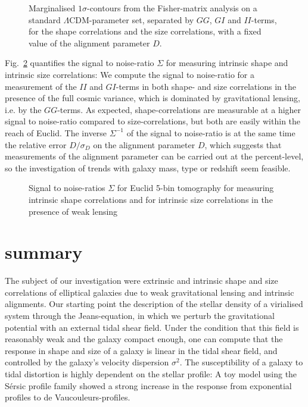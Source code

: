 \documentclass[a4paper,fleqn,usenatbib]{mnras}
\begin{document}
\begin{figure}
\centering
\caption{Marginalised $1\sigma$-contours from the Fisher-matrix analysis on a standard $\Lambda$CDM-parameter set, separated by $GG$, $GI$ and $II$-terms, for the shape correlations and the size correlations, with a fixed value of the alignment parameter $D$.}
\label{fig:fisher}
\end{figure}

Fig.~\ref{fig:s2n} quantifies the signal to noise-ratio $\Sigma$ for measuring intrinsic shape and intrinsic size correlations: We compute the signal to noise-ratio for a measurement of the $II$ and $GI$-terms in both shape- and size correlations in the presence of the full cosmic variance, which is dominated by gravitational lensing, i.e. by the $GG$-terms. As expected, shape-correlations are measurable at a higher signal to noise-ratio compared to size-correlations, but both are easily within the reach of Euclid. The inverse $\Sigma^{-1}$ of the signal to noise-ratio is at the same time the relative error $D/\sigma_D$ on the alignment parameter $D$, which suggests that measurements of the alignment parameter can be carried out at the percent-level, so the investigation of trends with galaxy mass, type or redshift seem feasible.

\begin{figure}
\centering
\caption{Signal to noise-ratios $\Sigma$ for Euclid 5-bin tomography for measuring intrinsic shape correlations and for intrinsic size correlations in the presence of weak lensing}
\label{fig:s2n}
\end{figure}


\section{summary}\label{sect_summary}
The subject of our investigation were extrinsic and intrinsic shape and size correlations of elliptical galaxies due to weak gravitational lensing and intrinsic alignments. Our starting point the description of the stellar density of a virialised system through the Jeans-equation, in which we perturb the gravitational potential with an external tidal shear field. Under the condition that this field is reasonably weak and the galaxy compact enough, one can compute that the response in shape and size of a galaxy is linear in the tidal shear field, and controlled by the galaxy's velocity dispersion $\sigma^2$. The susceptibility of a galaxy to tidal distortion is highly dependent on the stellar profile: A toy model using the S{\'e}rsic profile family showed a strong increase in the response from exponential profiles to de Vaucouleurs-profiles.
\end{document}
